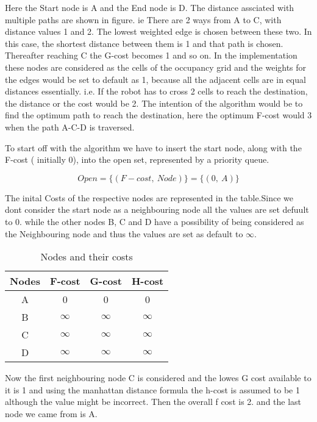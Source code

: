 Here the Start node is A and the End node is D. The distance assciated with multiple paths are shown in figure. ie There are 2 ways from A to C, with distance values 1 and 2. The lowest weighted edge is chosen between these two. In this case, the shortest distance between them is 1 and that path is chosen. Thereafter reaching C the G-cost becomes 1 and so on. In the implementation these nodes are considered as the cells of the occupancy grid and the weights for the edges would be set to default as 1, because all the adjacent cells are in equal distances essentially. i.e. If the robot has to cross 2 cells to reach the destination, the distance or the cost would be 2. The intention of the algorithm would be to find the optimum path to reach the destination, here the optimum F-cost would 3 when the path A-C-D is traversed.

To start off with the algorithm we have to insert the start node, along with the F-cost ( initially 0), into the open set, represented by a priority queue. 

\[Open = \{(F-cost, \ Node)\} = \{(0, \ A)\}\]

The inital Costs of the respective nodes are represented in the table.Since we dont consider the start node as a neighbouring node all the values are set defuult to 0. while the other nodes B, C and D have a possibility of being considered as the Neighbouring node and thus the values are set as default to $\infty$. 

\begin{table}[H]
\centering
    \begin{tabular}{ |c|c|c|c| } 
    \hline
    Nodes & F-cost & G-cost & H-cost \\
    \hline 
    A & 0 & 0 & 0\\ 
    B & $\infty$ & $\infty$ & $\infty$\\ 
    C & $\infty$ & $\infty$ & $\infty$\\ 
    D & $\infty$ & $\infty$ & $\infty$\\
    \hline
    \end{tabular}
    \caption{Nodes and their costs}
    \label{table:nodeCost0}
\end{table}

Now the first neighbouring node C is considered and the lowes G cost available to it is 1 and using the manhattan distance formula the h-cost is assumed to be 1 although the value might be incorrect. Then the overall f cost is 2. and the last node we came from is A. 

